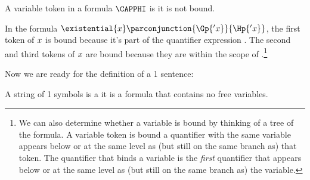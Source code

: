 \begin{majorILnc}{}
	A variable token in a formula $\CAPPHI$ is  \Iff it is not bound.
\end{majorILnc}

\noindent{}In the formula $\existential{\variable{x}}\parconjunction{\Gp{'\variable{x}}}{\Hp{'\variable{x}}}$, the first token of $x$ is bound because it's part of the quantifier expression .  The second and third tokens of $x$ are bound because they are within the scope of .\footnote{
	We can also determine whether a variable is bound by thinking of a tree of the formula. A variable token is bound \Iff a quantifier with the same variable appears below or at the same level as (but still on the same branch as) that token. 
	The quantifier that binds a variable is the \emph{first} quantifier that appears below or at the same level as (but still on the same branch as) the variable. 
}

Now we are ready for the definition of a \GQL{}1 sentence:

\begin{majorILnc}{}
A string of \GQL{}1 symbols is a  \Iff it is a formula that contains no free variables.
\end{majorILnc}

